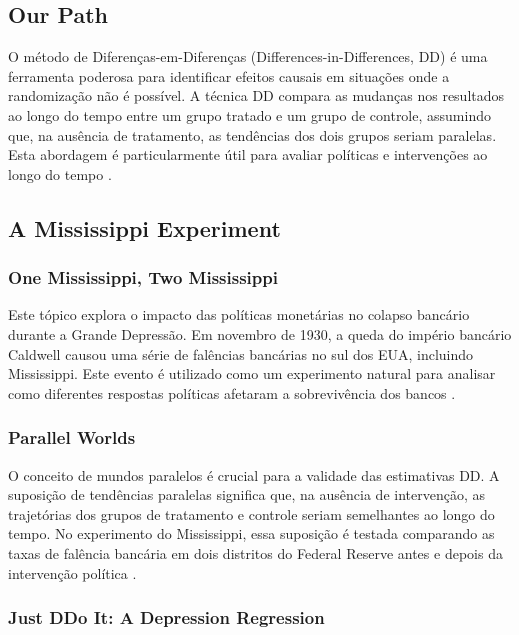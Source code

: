 \documentclass[a4paper,12pt]{article}[abntex2]
\begin{document}
\subsection*{Our Path}

O método de Diferenças-em-Diferenças (Differences-in-Differences, DD) é uma ferramenta poderosa para identificar efeitos causais em situações onde a randomização não é possível. A técnica DD compara as mudanças nos resultados ao longo do tempo entre um grupo tratado e um grupo de controle, assumindo que, na ausência de tratamento, as tendências dos dois grupos seriam paralelas. Esta abordagem é particularmente útil para avaliar políticas e intervenções ao longo do tempo  .

\subsection{A Mississippi Experiment}

\subsubsection*{One Mississippi, Two Mississippi}

Este tópico explora o impacto das políticas monetárias no colapso bancário durante a Grande Depressão. Em novembro de 1930, a queda do império bancário Caldwell causou uma série de falências bancárias no sul dos EUA, incluindo Mississippi. Este evento é utilizado como um experimento natural para analisar como diferentes respostas políticas afetaram a sobrevivência dos bancos .

\subsubsection*{Parallel Worlds}

O conceito de mundos paralelos é crucial para a validade das estimativas DD. A suposição de tendências paralelas significa que, na ausência de intervenção, as trajetórias dos grupos de tratamento e controle seriam semelhantes ao longo do tempo. No experimento do Mississippi, essa suposição é testada comparando as taxas de falência bancária em dois distritos do Federal Reserve antes e depois da intervenção política .

\subsubsection*{Just DDo It: A Depression Regression}
\end{document}
